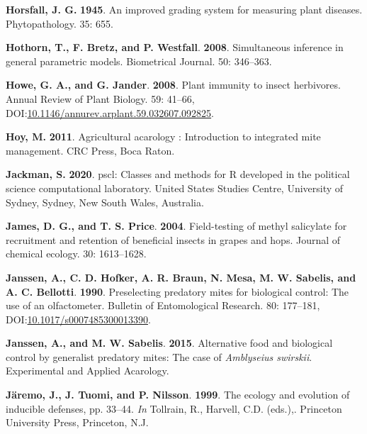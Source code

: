 \documentclass[12pt,final,CPage]{ufthesis}
\newlength{\cslhangindent}
\newenvironment{CSLReferences}[2] %
{%
	\setlength{\parindent}{0pt}
	\ifodd #1 \everypar{\setlength{\hangindent}{\cslhangindent}}\ignorespaces\fi
	\ifnum #2 > 0
	\setlength{\parskip}{#2\baselineskip}
	\fi
}%
{}
\begin{document}
{\begin{CSLReferences}{1}{0}
  \leavevmode{}%
  \textbf{Horsfall, J. G.} \textbf{1945}. An improved grading system for measuring plant diseases. Phytopathology. 35: 655.

  \leavevmode{}%
  \textbf{Hothorn, T., F. Bretz, and P. Westfall}. \textbf{2008}. Simultaneous inference in general parametric models. Biometrical Journal. 50: 346--363.

  \leavevmode{}%
  \textbf{Howe, G. A., and G. Jander}. \textbf{2008}. Plant immunity to insect herbivores. Annual Review of Plant Biology. 59: 41--66, DOI:\href{https://doi.org/10.1146/annurev.arplant.59.032607.092825}{10.1146/annurev.arplant.59.032607.092825}.

  \leavevmode{}%
  \textbf{Hoy, M.} \textbf{2011}. Agricultural acarology : Introduction to integrated mite management. CRC Press, Boca Raton.

  \leavevmode{}%
  \textbf{Jackman, S.} \textbf{2020}. {pscl}: Classes and methods for {R} developed in the political science computational laboratory. United States Studies Centre, University of Sydney, Sydney, New South Wales, Australia.

  \leavevmode{}%
  \textbf{James, D. G., and T. S. Price}. \textbf{2004}. Field-testing of methyl salicylate for recruitment and retention of beneficial insects in grapes and hops. Journal of chemical ecology. 30: 1613--1628.

  \leavevmode{}%
  \textbf{Janssen, A., C. D. Hofker, A. R. Braun, N. Mesa, M. W. Sabelis, and A. C. Bellotti}. \textbf{1990}. Preselecting predatory mites for biological control: The use of an olfactometer. Bulletin of Entomological Research. 80: 177--181, DOI:\href{https://doi.org/10.1017/s0007485300013390}{10.1017/s0007485300013390}.

  \leavevmode{}%
  \textbf{Janssen, A., and M. W. Sabelis}. \textbf{2015}. Alternative food and biological control by generalist predatory mites: The case of {\emph{Amblyseius swirskii}}. Experimental and Applied Acarology.

  \leavevmode{}%
  \textbf{Järemo, J., J. Tuomi, and P. Nilsson}. \textbf{1999}. The ecology and evolution of inducible defenses, pp. 33--44. \emph{In} Tollrain, R., Harvell, C.D. (eds.),. Princeton University Press, Princeton, N.J.


\end{CSLReferences}}
\end{document}
